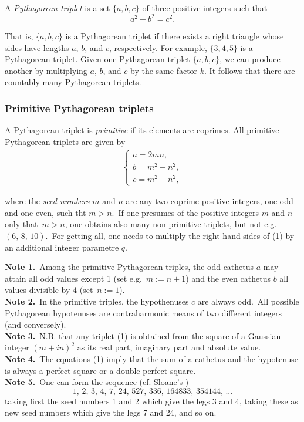 \documentclass[12pt]{article}
\begin{document}
A \emph{Pythagorean triplet} is a set $\{a, b, c\}$ of three positive 
integers such that
\[ 
   a^2 + b^2 = c^2.  
\]

That is, $\{a, b, c\}$ is a Pythagorean triplet if there exists a
right triangle whose sides have lengths $a$, $b$, and $c$,
respectively.  For example, $\{3, 4, 5\}$ is a Pythagorean triplet.
Given one Pythagorean triplet $\{a, b, c\}$, we can produce another by
multiplying $a$, $b$, and $c$ by the same factor $k$.  It follows that
there are countably many Pythagorean triplets.

\subsubsection*{Primitive Pythagorean triplets}

A Pythagorean triplet is \emph{primitive} if its elements are
coprimes.  All primitive Pythagorean triplets are given by
\begin{align}
\begin{cases}
a = 2mn,\\
b = m^2\!-\!n^2,\\
c = m^2\!+\!n^2,
\end{cases}
\end{align}

where the \emph{seed numbers} $m$ and $n$ are any two coprime positive
integers, one odd and one even, such tht $m > n$.\, If one presumes of the positive integers $m$ and $n$ only that\, $m > n$, one obtains also many non-primitive triplets, but not e.g. $(6,\,8,\,10)$.\, For getting all, one needs to multiply the right hand sides of (1) by an additional integer parametre $q$.

\textbf{Note 1.}\, Among the primitive Pythagorean triples, the odd cathetus $a$ may attain all odd values except 1 (set e.g.\, $m := n\!+\!1$) and the even cathetus $b$ all values divisible by 4 (set\, $n := 1$).\\

\textbf{Note 2.}\, In the primitive triples, the hypothenuses $c$ are always odd.\, All possible Pythagorean hypotenuses are contraharmonic means of two different integers (and conversely).\\

\textbf{Note 3.}\, N.B. that any triplet (1) is obtained from the square of a Gaussian integer $(m\!+\!in)^2$ as its real part, imaginary part and absolute value.\\

\textbf{Note 4.}\, The equations (1) imply that the sum of a cathetus and the hypotenuse is always a perfect square or a double perfect square.\\

\textbf{Note 5.}\, One can form the sequence (cf. Sloane's )
\[
  1,\,2,\,3,\,4,\,7,\,24,\,527,\,336,\,164833,\,354144,\,...
\]
taking first the seed numbers 1 and 2 which give the legs 3 and 4,
taking these as new seed numbers which give the legs 7 and 24, and
so on.


\end{document}
